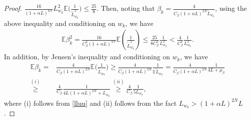 \documentclass{osudissert96}
\begin{document}
\begin{proof}
$	\frac{16}{(1+\alpha L)^{4N}}L^2_{w_k}	\mathbb{E} \Big(  \frac{1}{\widetilde L^2_{w_k} }\Big) \leq \frac{25}{8}.$
	Then, noting that $\beta_k  = \frac{4}{C_\beta (1+\alpha L)^{2N} \widetilde L_{w_k}}$, using the above inequality and conditioning on $w_k$,  we have 
	\begin{align}\label{secondmm}
	\mathbb{E}\beta^2_k =  \frac{16}{C^2_\beta (1+\alpha L)^{4N}}\mathbb{E}  \left(\frac{1}{ \widetilde L^2_{w_k}} \right) \leq \frac{25}{8C_\beta^2} \frac{1}{L^2_{w_k}} < \frac{4}{C_\beta^2} \frac{1}{L^2_{w_k}}.
	\end{align}
	In addition, by Jensen's inequality and conditioning on $w_k$, we have 
	\begin{align}\label{onemo}
	\mathbb{E} \beta_k =&\frac{4}{C_\beta (1+\alpha L)^{2N} } \mathbb{E}\Big(\frac{1}{ \widetilde L_{w_k}}\Big) \geq  \frac{4}{C_\beta (1+\alpha L)^{2N} } \frac{1}{ \mathbb{E}\widetilde L_{w_k}} =  \frac{4}{C_\beta (1+\alpha L)^{2N} } \frac{1}{4L + \mu_\beta} \nonumber
	\\\overset{(i)}\geq &   \frac{4}{C_\beta  } \frac{1}{4L(1+\alpha L)^{2N} +L_{w_k}}  \overset{(ii)}\geq \frac{4}{C_\beta} \frac{1}{5 L_{w_k}}, 
	\end{align}
	where (i) follows from \cref{lluu} and (ii) follows from the fact $L_{w_k} >  (1+\alpha L)^{2N}L$.
\end{proof}
\end{document}
